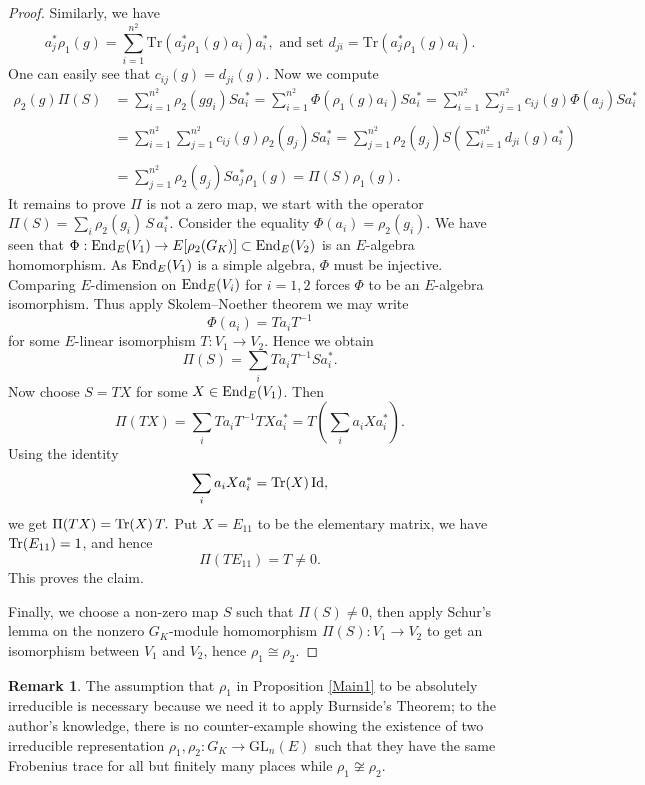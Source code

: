 \documentclass[20pt, oneside]{article}   	%
\theoremstyle{definition}
\newtheorem{rem}[thm]{Remark}
\newcommand{\GL}{\mathrm{GL}}
\begin{document}
\begin{proof}
Similarly, we have \begin{equation}
a_j^* \rho_1(g) = \sum_{i=1}^{n^2} \text{Tr}(a_j^* \rho_1(g) a_i) a_i^* \tag{2}, \textrm{ and set }d_{ji}=\text{Tr}(a_j^* \rho_1(g) a_i).\end{equation}
One can easily see that $c_{ij}(g)=d_{ji}(g)$. Now we compute
$$
\begin{array}{ll}
\rho_2(g)\Pi(S)&=\sum_{i=1}^{n^2}\rho_2(gg_i)Sa_i^*=\sum_{i=1}^{n^2}\Phi(\rho_1(g)a_i)Sa_i^*=\sum_{i=1}^{n^2}\sum_{j=1}^{n^2}c_{ij}(g)\Phi(a_j)Sa_i^*\\
&\ \\
&=\sum_{i=1}^{n^2}\sum_{j=1}^{n^2}c_{ij}(g)\rho_2(g_j)Sa_i^*=\sum_{j=1}^{n^2}\rho_2(g_j)S\left(\sum_{i=1}^{n^2} d_{ji}(g)a_i^*\right)\\
&\ \\
&=\sum_{j=1}^{n^2}\rho_2(g_j)Sa_j^*\rho_1(g)=\Pi(S)\rho_1(g).
\end{array}
$$
It remains to prove $\Pi$ is not a zero map, we start with the operator $\Pi(S)=\sum_i \rho_2(g_i)\, S\, a_i^\ast.$
Consider the equality $\Phi(a_i)=\rho_2(g_i)$. We have seen that $\Phi:{\rm End}_E(V_1)\rightarrow E[\rho_2(G_K)]\subset {\rm End}_E(V_2)$ is an $E$-algebra homomorphism. As ${\rm End}_E(V_1)$ is a simple algebra, $\Phi$ must be injective. Comparing $E$-dimension on ${\rm End}_E(V_i)$ for $i=1,2$ forces $\Phi$ to be an $E$-algebra isomorphism. Thus apply Skolem--Noether theorem we may write
\[
\Phi(a_i)=Ta_iT^{-1}
\]
for some $E$-linear isomorphism $T:V_1 \to V_2$. Hence we obtain
\[
\Pi(S)=\sum_i T a_i T^{-1} S a_i^\ast.
\]
Now choose $S = TX$ for some $X \in {\rm End}_E(V_1)$. Then
\[
\Pi(TX)
=
\sum_i T a_i T^{-1} T X a_i^\ast
=
T\left(\sum_i a_i X a_i^\ast\right).
\]
Using the identity
$$\sum_i a_i X a_i^\ast = {\rm Tr}(X)\,\mathrm{Id},$$
we get $\Pi(TX)={\rm Tr}(X)\,T.$ Put $X=E_{11}$ to be the elementary matrix, we have ${\rm Tr}(E_{11})=1$, and hence
\[
\Pi(T E_{11}) = T \neq 0.
\]
This proves the claim.

Finally, we choose a  non-zero map $S$ such that $\Pi(S)\neq0$, then apply Schur's lemma on the nonzero $G_K$-module homomorphism $\Pi(S):V_1\rightarrow V_2$ to get an isomorphism between $V_1$ and $V_2$, hence $\rho_1\cong\rho_2$.



\end{proof}

\begin{rem}
The assumption that $\rho_1$ in Proposition \ref{Main1} to be absolutely irreducible is necessary because we need it to apply Burnside's Theorem; to the author's knowledge, there is no counter-example showing the existence of two irreducible representation $\rho_1,\rho_2:G_K\rightarrow \GL_n(E)$ such that they have the same Frobenius trace for all but finitely many places while $\rho_1\not\cong\rho_2$.


\end{rem}
\end{document}
